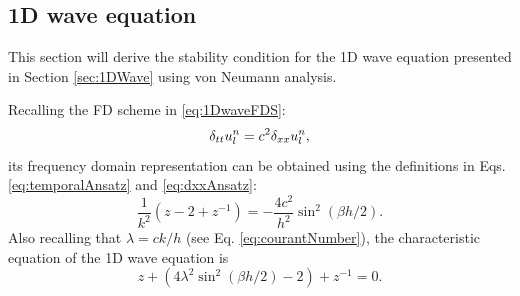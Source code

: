 {{\subsection{1D wave equation}\label{sec:vonNeumann1DWave}
This section will derive the stability condition for the 1D wave equation presented in Section \ref{sec:1DWave} using von Neumann analysis.

Recalling the FD scheme in \eqref{eq:1DwaveFDS}:
\begin{equation*}
    \delta_{tt} u_l^n = c^2 \delta_{xx} u_l^n,
\end{equation*}
its frequency domain representation can be obtained using the definitions in Eqs. \eqref{eq:temporalAnsatz} and \eqref{eq:dxxAnsatz}:
\begin{equation}
    \frac{1}{k^2}\left(z - 2 + z^{-1}\right) = -\frac{4c^2}{h^2}\sin^2\left(\beta h / 2\right).
\end{equation}
Also recalling that $\lambda = ck/h$ (see Eq. \eqref{eq:courantNumber}), the characteristic equation of the 1D wave equation is
\begin{equation}\label{eq:1dWaveCharacteristic}
    z + \left(4\lambda^2\sin^2(\beta h / 2) -2\right) + z^{-1} = 0.
\end{equation}
}}
